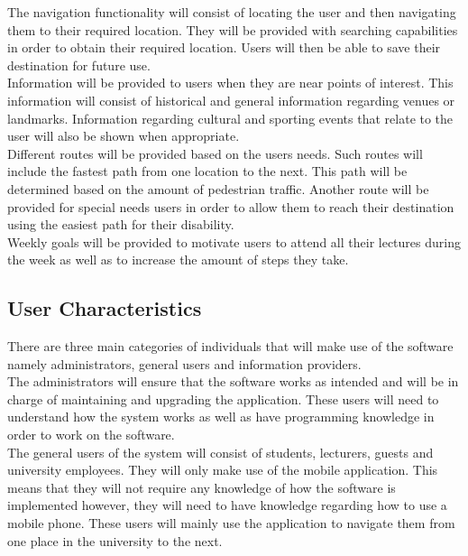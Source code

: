 \documentclass[11pt,a4paper]{article}
\begin{document}
	The navigation functionality will consist of locating the user and then navigating them to their required location. They will be provided with searching capabilities in order to obtain their required location. Users will then be able to save their destination for future use.
	\\

	Information will be provided to users when they are near points of interest. This information will consist of historical and general information regarding venues or landmarks. Information regarding cultural and sporting events that relate to the user will also be shown when appropriate.
	\\

	Different routes will be provided based on the users needs. Such routes will include the fastest path from one location to the next. This path will be determined based on the amount of pedestrian traffic. Another route will be provided for special needs users in order to allow them to reach their destination using the easiest path for their disability.
	\\

	Weekly goals will be provided to motivate users to attend all their lectures during the week as well as to increase the amount of steps they take.

	\subsection{User Characteristics}
	There are three main categories of individuals that will make use of the software namely administrators, general users and information providers.
	\\


	The administrators will ensure that the software works as intended and will be in charge of maintaining and upgrading the application. These users will need to understand how the system works as well as have programming knowledge in order to work on the software.
	\\

	The general users of the system will consist of students, lecturers, guests and university employees. They will only make use of the mobile application. This means that they will not require any knowledge of how the software is implemented however, they will need to have knowledge regarding how to use a mobile phone. These users will mainly use the application to navigate them 		from one place in the university to the next.
	\\
\end{document}
